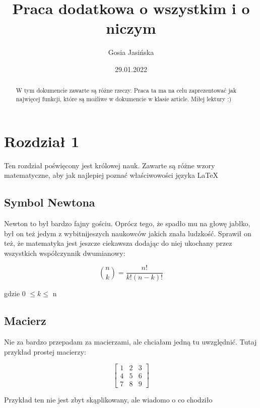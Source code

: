 \documentclass{article}
\title{Praca dodatkowa o wszystkim i o niczym}
\author{Gosia Jasińska}
\date{29.01.2022}
\begin{document}
		
\maketitle

\newpage
\begin{abstract}
	W tym dokumencie zawarte są różne rzeczy. Praca ta ma na celu zaprezentować jak najwięcej funkcji, które są możliwe w dokumencie w klasie article. Miłej lektury :)
\end{abstract}

\newpage
\tableofcontents
\listoffigures
\listoftables

\newpage
\section{Rozdział 1}
Ten rozdział poświęcony jest królowej nauk. Zawarte są różne wzory matematyczne, aby jak najlepiej poznać właściwowości języka \LaTeX

\subsection{Symbol Newtona }
Newton to był bardzo fajny gościu. Oprócz tego, że spadło mu na głowę jabłko, był on też jedym z wybitnijeszych naukowców jakich znała ludzkość. Sprawił on też, że matematyka jest jeszcze ciekawsza dodając do niej ukochany przez wszystkich  współczynnik dwumianowy: 

\begin{equation}
	{n \choose k}=\frac{n!}{k!(n-k)!}
\end{equation}

gdzie 0 $\le k $$\le$  n

\subsection{Macierz }
Nie za bardzo przepadam za macierzami, ale chciałam jedną tu uwzględnić. Tutaj przykład prostej macierzy:

\begin{displaymath}
	\left[\begin{array}{ccc}
		1 & 2 & 3 \\
		4 & 5 & 6 \\
		7 & 8 & 9 
	\end{array}\right] 
\end{displaymath}
	
Przykład ten nie jest zbyt skąplikowany, ale wiadomo o co chodziło
	
\end{document}
